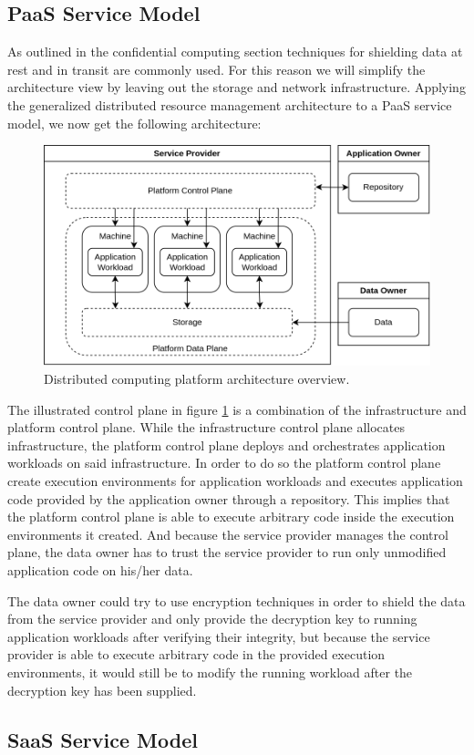 \subsection{PaaS Service Model}

As outlined in the confidential computing section techniques for shielding data
at rest and in transit are commonly used. For this reason we will simplify the
architecture view by leaving out the storage and network infrastructure.
Applying the generalized distributed resource management architecture to a PaaS
service model, we now get the following architecture:

\begin{figure}[ht]
  \centering
  \includegraphics[width=0.8\linewidth]{resources/distributed-computing-platform-architecture.png}
  \caption{Distributed computing platform architecture overview.}
  \label{fig:distributed-computing-platform-architecture}
\end{figure}

The illustrated control plane in figure
\ref{fig:distributed-computing-platform-architecture} is a combination of the
infrastructure and platform control plane. While the infrastructure control
plane allocates infrastructure, the platform control plane deploys and
orchestrates application workloads on said infrastructure. In order to do so the
platform control plane create execution environments for application workloads
and executes application code provided by the application owner through a
repository. This implies that the platform control plane is able to execute
arbitrary code inside the execution environments it created. And because the
service provider manages the control plane, the data owner has to trust the
service provider to run only unmodified application code on his/her data.

The data owner could try to use encryption techniques in order to shield the
data from the service provider and only provide the decryption key to running
application workloads after verifying their integrity, but because the service
provider is able to execute arbitrary code in the provided execution
environments, it would still be to modify the running workload after the
decryption key has been supplied.

\subsection{SaaS Service Model}

